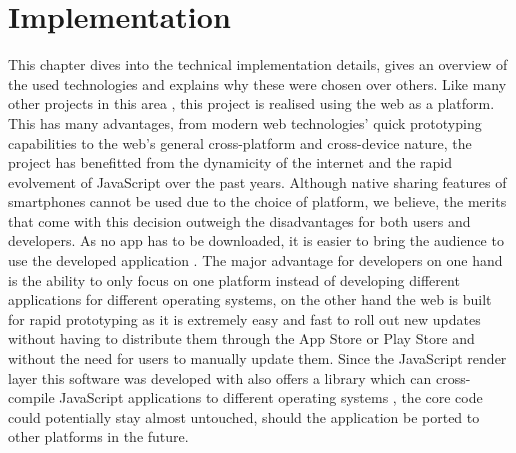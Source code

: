 \chapter{Implementation}
\label{cha:implementation}



This chapter dives into the technical implementation details, gives an over\-view of the used technologies and explains why these were chosen over others. Like many other projects in this area \cite{Bry:Backstage, Cheng:TreebasedOnlinePresentations, Esponda:ElectronicVotingOnTheFly, Inoue:RealTimeQuestionnaire, Teevan:MobileFeedbackDuringPresentation, Triglianos:InteractiveWebPresentationsImpress}, this project is realised using the web as a platform.
This has many advantages, from modern web technologies' quick prototyping capabilities to the web's general cross-platform and cross-device nature, the project has benefitted from the dynamicity of the internet and the rapid evolvement of JavaScript over the past years.
Although native sharing features of smartphones cannot be used due to the choice of platform, we believe, the merits that come with this decision outweigh the disadvantages for both users and developers. As no app has to be downloaded, it is easier to bring the audience to use the developed application \cite{Triglianos:InteractiveWebPresentationsImpress}. The major advantage for developers on one hand is the ability to only focus on one platform instead of developing different applications for different operating systems, on the other hand the web is built for rapid prototyping as it is extremely easy and fast to roll out new updates without having to distribute them through the App Store or Play Store and without the need for users to manually update them. Since the JavaScript render layer this software was developed with \cite{react} also offers a library which can cross-compile JavaScript applications to different operating systems \cite{react-native}, the core code could potentially stay almost untouched, should the application be ported to other platforms in the future.

